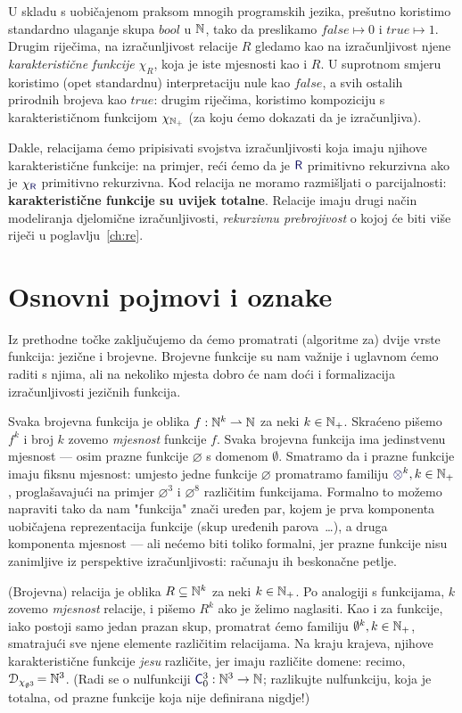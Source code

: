 U skladu s uobičajenom praksom mnogih programskih jezika, prešutno koristimo standardno ulaganje skupa $bool$ u ${\mathbb N}$, tako da preslikamo $\mathit{false}\mapsto 0$ i $\mathit{true}\mapsto 1$. Drugim riječima, na izračunljivost relacije $R$ gledamo kao na izračunljivost njene \emph{karakteristične funkcije} $\chi_R$, koja je iste mjesnosti kao i $R$. U suprotnom smjeru koristimo (opet standardnu) interpretaciju nule kao $\mathit{false}$, a svih ostalih prirodnih brojeva kao $\mathit{true}$: drugim riječima, koristimo kompoziciju s karakterističnom funkcijom $\chi_{{\mathbb N}_+}$ (za koju ćemo dokazati da je izračunljiva).

Dakle, relacijama ćemo pripisivati svojstva izračunljivosti koja imaju njihove karakteristične funkcije: na primjer, reći ćemo da je $\f{R}$ primitivno rekurzivna ako je $\chi_{\f{R}}$ primitivno rekurzivna. Kod relacija ne moramo razmišljati o parcijalnosti: \textbf{karakteristične funkcije su uvijek totalne}. Relacije imaju drugi način modeliranja djelomične izračunljivosti, \emph{rekurzivnu prebrojivost} o kojoj će biti više riječi u poglavlju~\ref{ch:re}.

\section{Osnovni pojmovi i oznake}

Iz prethodne točke zaključujemo da ćemo promatrati (algoritme za) dvije vrste funkcija: jezične i brojevne. Brojevne funkcije su nam važnije i uglavnom ćemo raditi s njima, ali na nekoliko mjesta dobro će nam doći i formalizacija izračunljivosti jezičnih funkcija.

Svaka brojevna funkcija je oblika $f:{\mathbb N}^k\rightharpoonup{\mathbb N}$ za neki $k\in{\mathbb N}_+$. Skraćeno pišemo $f^k$ i broj $k$ zovemo \emph{mjesnost} funkcije $f$. Svaka brojevna funkcija ima jedinstvenu mjesnost --- osim prazne funkcije $\varnothing$ s domenom $\emptyset$. Smatramo da i prazne funkcije imaju fiksnu mjesnost: umjesto jedne funkcije $\varnothing$ promatramo familiju $\varnothing^k,k\in\N_+$, proglašavajući na primjer $\varnothing^3$ i $\varnothing^8$ različitim funkcijama. Formalno to možemo napraviti tako da nam "funkcija" znači uređen par, kojem je prva komponenta uobičajena reprezentacija funkcije (skup uređenih parova~\ldots), a druga komponenta mjesnost --- ali nećemo biti toliko formalni, jer prazne funkcije nisu zanimljive iz perspektive izračunljivosti: računaju ih beskonačne petlje.

(Brojevna) relacija je oblika $R\subseteq{\mathbb N}^k$ za neki $k\in{\mathbb N}_+$. Po analogiji s funkcijama, $k$ zovemo \emph{mjesnost} relacije, i pišemo $R^k$ ako je želimo naglasiti. Kao i za funkcije, iako postoji samo jedan prazan skup, promatrat ćemo familiju $\emptyset^k,k\in{\mathbb N}_+$, smatrajući sve njene elemente različitim relacijama. Na kraju krajeva, njihove karakteristične funkcije \emph{jesu} različite, jer imaju različite domene: recimo, $\mathcal D_{\chi_{\emptyset^3}}\!={\mathbb N}^3$. (Radi se o nulfunkciji $\f C_0^3:\N^3\to\N$; razlikujte nulfunkciju, koja je totalna, od prazne funkcije koja nije definirana nigdje!)

